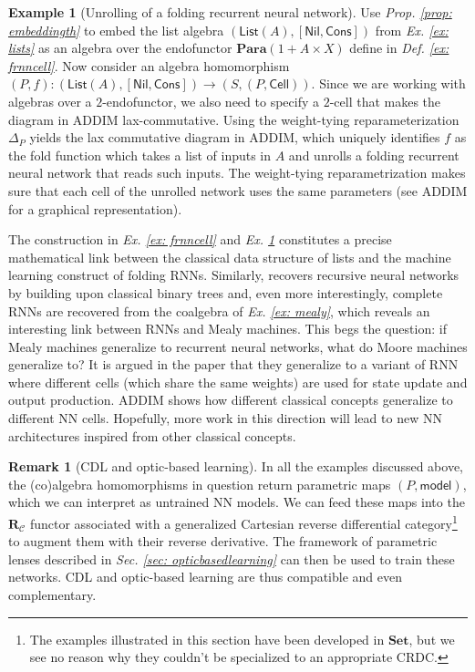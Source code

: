 \documentclass[11pt,a4paper,openright,twoside]{report}
\theoremstyle{plain}
\theoremstyle{definition}
\newtheorem{remark}[proposition]{Remark}
\newtheorem{example}[proposition]{Example}
\begin{document}
\begin{example}[Unrolling of a folding recurrent neural network]
  \label{ex: frnnunroll}
  Use \textit{Prop. \ref{prop: embeddingth}} to embed the list algebra $(\mathsf{List}(A), [\mathsf{Nil}, \mathsf{Cons}])$ from \textit{Ex. \ref{ex: lists}} as an algebra over the endofunctor $\mathbf{Para}(1 + A \times X)$ define in \textit{Def. \ref{ex: frnncell}}. Now consider an algebra homomorphism $(P,f): (\mathsf{List}(A), [\mathsf{Nil}, \mathsf{Cons}]) \to (S,(P,\mathsf{Cell}))$. Since we are working with algebras over a $2$-endofunctor, we also need to specify a $2$-cell that makes the diagram in ADDIM lax-commutative. Using the weight-tying reparameterization $\Delta_P$ yields the lax commutative diagram in ADDIM, which uniquely identifies $f$ as the fold function which takes a list of inputs in $A$ and unrolls a folding recurrent neural network that reads such inputs. The weight-tying reparametrization makes sure that each cell of the unrolled network uses the same parameters (see ADDIM for a graphical representation). 
\end{example}


The construction in  \textit{Ex. \ref{ex: frnncell}} and \textit{Ex. \ref{ex: frnnunroll}} constitutes a precise mathematical link between the classical data structure of lists and the machine learning construct of folding RNNs. Similarly, \cite{gavranovicposition} recovers recursive neural networks by building upon classical binary trees and, even more interestingly, complete RNNs are recovered from the coalgebra of \textit{Ex. \ref{ex: mealy}}, which reveals an interesting link between RNNs and Mealy machines. This begs the question: if Mealy machines generalize to recurrent neural networks, what do Moore machines generalize to? It is argued in the paper that they generalize to a variant of RNN where different cells (which share the same weights) are used for state update and output production. ADDIM shows how different classical concepts generalize to different NN cells. Hopefully, more work in this direction will lead to new NN architectures inspired from other classical concepts.

\begin{remark}[CDL and optic-based learning]
  In all the examples discussed above, the (co)algebra homomorphisms in question return parametric maps $(P,\mathsf{model})$, which we can interpret as untrained NN models. We can feed these maps into the $\mathbf{R}_{\mathcal{C}}$ functor associated with a generalized Cartesian reverse differential category\footnote{The examples illustrated in this section have been developed in $\mathbf{Set}$, but we see no reason why they couldn't be specialized to an appropriate CRDC.} to augment them with their reverse derivative. The framework of parametric lenses described in 
  \textit{Sec. \ref{sec: opticbasedlearning}} can then be used to train these networks. CDL and optic-based learning are thus compatible and even complementary.
\end{remark}
\end{document}
